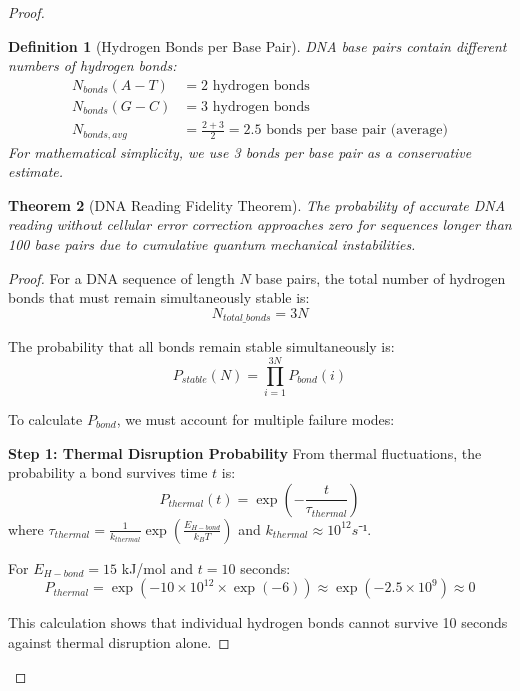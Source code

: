 \documentclass[12pt,a4paper]{article}
\newtheorem{theorem}{Theorem}[section]
\newtheorem{definition}[theorem]{Definition}
\begin{document}
\begin{proof}
\begin{definition}[Hydrogen Bonds per Base Pair]
DNA base pairs contain different numbers of hydrogen bonds:
\begin{align}
N_{bonds}(A-T) &= 2 \text{ hydrogen bonds} \\
N_{bonds}(G-C) &= 3 \text{ hydrogen bonds} \\
N_{bonds,avg} &= \frac{2 + 3}{2} = 2.5 \text{ bonds per base pair (average)}
\end{align}
For mathematical simplicity, we use 3 bonds per base pair as a conservative estimate.
\end{definition}

\begin{theorem}[DNA Reading Fidelity Theorem]
The probability of accurate DNA reading without cellular error correction approaches zero for sequences longer than 100 base pairs due to cumulative quantum mechanical instabilities.
\end{theorem}

\begin{proof}
For a DNA sequence of length $N$ base pairs, the total number of hydrogen bonds that must remain simultaneously stable is:
\begin{equation}
N_{total\_bonds} = 3N
\end{equation}

The probability that all bonds remain stable simultaneously is:
\begin{equation}
P_{stable}(N) = \prod_{i=1}^{3N} P_{bond}(i)
\end{equation}

To calculate $P_{bond}$, we must account for multiple failure modes:

\textbf{Step 1: Thermal Disruption Probability}
From thermal fluctuations, the probability a bond survives time $t$ is:
\begin{equation}
P_{thermal}(t) = \exp\left(-\frac{t}{\tau_{thermal}}\right)
\end{equation}
where $\tau_{thermal} = \frac{1}{k_{thermal}} \exp\left(\frac{E_{H-bond}}{k_BT}\right)$ and $k_{thermal} \approx 10^{12} s⁻¹.$

For $E_{H-bond} = 15$ kJ/mol and $t = 10$ seconds:
\begin{equation}
P_{thermal} = \exp\left(-10 \times 10^{12} \times \exp(-6)\right) \approx \exp(-2.5 \times 10^9) \approx 0
\end{equation}

This calculation shows that individual hydrogen bonds cannot survive 10 seconds against thermal disruption alone.


\end{proof}
\end{proof}
\end{document}
